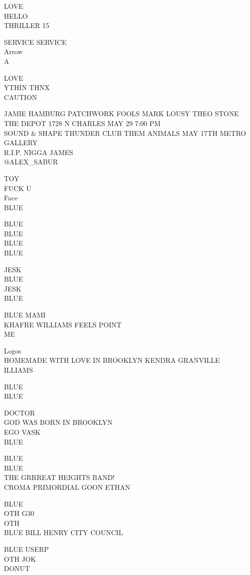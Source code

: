 \documentclass[10pt,letterpaper]{article}
\begin{document}
LOVE\\
HELLO\\
THRILLER 15

SERVICE SERVICE\\
Arrow\\
A

LOVE\\
YTHIN THNX\\
CAUTION

JAMIE HAMBURG PATCHWORK FOOLS MARK LOUSY THEO STONE THE DEPOT 1728 N CHARLES MAY 29 7:00 PM\\
SOUND \& SHAPE THUNDER CLUB THEM ANIMALS MAY 17TH METRO GALLERY\\
R.I.P. NIGGA JAMES\\
@ALEX\_SABUR

TOY\\
FUCK U\\
Face\\
BLUE

BLUE\\
BLUE\\
BLUE\\
BLUE

JESK\\
BLUE\\
JESK\\
BLUE

BLUE MAMI\\
KHAFRE WILLIAMS FEELS POINT\\
ME

Logos\\
HOMEMADE WITH LOVE IN BROOKLYN KENDRA GRANVILLE\\
ILLIAMS

BLUE\\
BLUE

DOCTOR\\
GOD WAS BORN IN BROOKLYN\\
EGO VASK\\
BLUE

BLUE\\
BLUE\\
THE GRRREAT HEIGHTS BAND!\\
CROMA PRIMORDIAL GOON ETHAN

BLUE\\
OTH G30\\
OTH\\
BLUE BILL HENRY CITY COUNCIL

BLUE USERP\\
OTH JOK\\
DONUT
\end{document}
